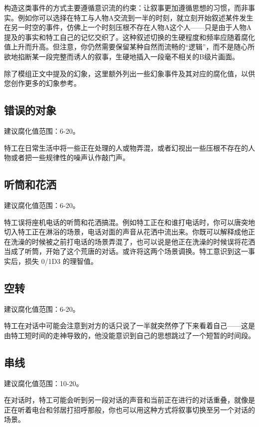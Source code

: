 构造这类事件的方式主要遵循意识流的约束：让叙事更加遵循思想的习惯，而非事实。例如你可以选择在特工与人物A交流到一半的时刻，就立刻开始叙述某件发生在另一时空的事件，仿佛上一个时刻压根不存在人物A这个人——只是由于人物A提及的事实和特工自己的记忆交织了。这种叙述切换的生硬程度和频率应随着腐化值上升而升高。但注意，你仍然需要保留某种自然而流畅的“逻辑”，而不是随心所欲地掐断某一段完整而诱人的叙事，生硬地插入一段毫不相关的B级片画面。

除了模组正文中提及的幻象，这里额外列出一些幻象事件及其对应的腐化值，以供您创作更多的幻象参考。

\subsection{错误的对象}

建议腐化值范围：6-20。

特工在日常生活中将一些正在处理的人或物弄混，或者幻视出一些压根不存在的人物或者把一些规律性的噪声认作敲门声。

\subsection{听筒和花洒}

建议腐化值范围：6-20。

特工误将座机电话的听筒和花洒搞混。例如特工正在和谁打电话时，你可以唐突地切入特工正在淋浴的场景，电话对面的声音从花洒中流出来。你既可以解释成他正在洗澡的时候被之前打电话的场景弄混了，也可以说是他正在洗澡的时候误将花洒当成了听筒，开始了这个荒唐的对话。或许将这两个场景调换。特工意识到这一事实后，损失 0/1D3 的理智值。

\subsection{空转}

建议腐化值范围：6-20。

特工在对话中可能会注意到对方的话只说了一半就突然停了下来看着自己——这是由特工短时间的走神导致的，他没能意识到自己的思想跳过了一个短暂的时间段。

\subsection{串线}

建议腐化值范围：10-20。

在对话时，特工可能会听到另一段对话的声音和当前正在进行的对话重叠，就像是正在听着电台和邻居打招呼那般，你也可以用这种方式将叙事切换至另一个对话的场景。

